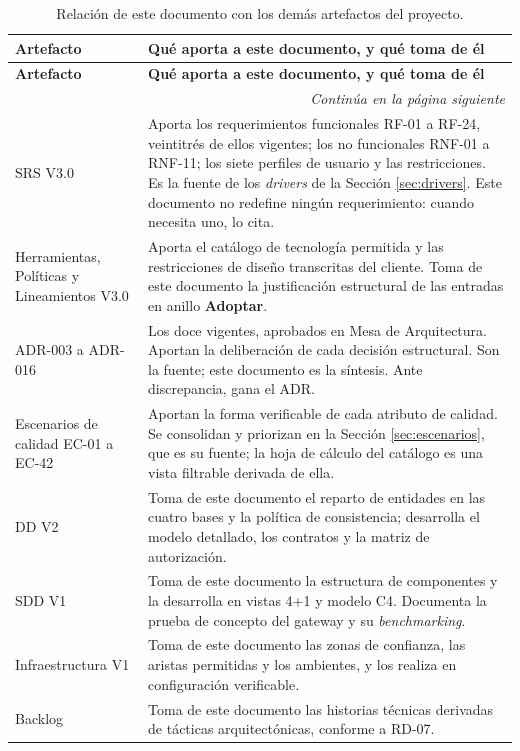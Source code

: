 \documentclass[11pt,a4paper]{article}
\newcommand{\adoptar}{\textcolor{ringAdoptar}{\textbf{Adoptar}}}
\newcommand{\contlinea}[1]{\multicolumn{#1}{r}{\footnotesize\itshape Continúa en la página siguiente}}
\begin{document}
\begin{longtable}{L{4.2cm} L{10.4cm}}
\caption{Relación de este documento con los demás artefactos del proyecto.}\label{tab:artefactos}\\
\toprule
\textbf{Artefacto} & \textbf{Qué aporta a este documento, y qué toma de él} \\
\midrule
\endfirsthead
\toprule
\textbf{Artefacto} & \textbf{Qué aporta a este documento, y qué toma de él} \\
\midrule
\endhead
\midrule
\contlinea{2} \\
\endfoot
\bottomrule
\endlastfoot
SRS V3.0 & Aporta los requerimientos funcionales RF-01 a RF-24, veintitrés de ellos vigentes; los no funcionales RNF-01 a RNF-11; los siete perfiles de usuario y las restricciones. Es la fuente de los \emph{drivers} de la Sección \ref{sec:drivers}. Este documento no redefine ningún requerimiento: cuando necesita uno, lo cita. \\
Herramientas, Políticas y Lineamientos V3.0 & Aporta el catálogo de tecnología permitida y las restricciones de diseño transcritas del cliente. Toma de este documento la justificación estructural de las entradas en anillo \adoptar{}. \\
ADR-003 a ADR-016 & Los doce vigentes, aprobados en Mesa de Arquitectura. Aportan la deliberación de cada decisión estructural. Son la fuente; este documento es la síntesis. Ante discrepancia, gana el ADR. \\
Escenarios de calidad EC-01 a EC-42 & Aportan la forma verificable de cada atributo de calidad. Se consolidan y priorizan en la Sección \ref{sec:escenarios}, que es su fuente; la hoja de cálculo del catálogo es una vista filtrable derivada de ella. \\
DD V2 & Toma de este documento el reparto de entidades en las cuatro bases y la política de consistencia; desarrolla el modelo detallado, los contratos y la matriz de autorización. \\
SDD V1 & Toma de este documento la estructura de componentes y la desarrolla en vistas 4+1 y modelo C4. Documenta la prueba de concepto del gateway y su \emph{benchmarking}. \\
Infraestructura V1 & Toma de este documento las zonas de confianza, las aristas permitidas y los ambientes, y los realiza en configuración verificable. \\
Backlog & Toma de este documento las historias técnicas derivadas de tácticas arquitectónicas, conforme a RD-07. \\
\end{longtable}
\end{document}
